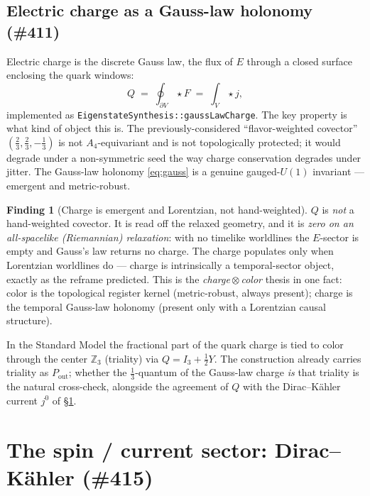 \documentclass[11pt]{article}
\theoremstyle{definition}
\newtheorem{finding}{Finding}
\newcommand{\Z}{\mathbb{Z}}
\newcommand{\Pout}{P_{\mathrm{out}}}
\newcommand{\code}[1]{\texttt{#1}}
\begin{document}
\subsection{Electric charge as a Gauss-law holonomy (\#411)}
\label{sec:gauss}

Electric charge is the discrete Gauss law, the flux of $E$ through a closed surface
enclosing the quark windows:
\begin{equation}
  Q \;=\; \oint_{\partial V} \star F \;=\; \int_V \star j ,
  \label{eq:gauss}
\end{equation}
implemented as \code{EigenstateSynthesis::gaussLawCharge}. The key property is what kind
of object this is. The previously-considered ``flavor-weighted covector''
$(\tfrac23,\tfrac23,-\tfrac13)$ is not $A_4$-equivariant and is not topologically
protected; it would degrade under a non-symmetric seed the way charge conservation
degrades under jitter. The Gauss-law holonomy \eqref{eq:gauss} is a genuine gauged-$U(1)$
invariant --- emergent and metric-robust.

\begin{finding}[Charge is emergent and Lorentzian, not hand-weighted]
\label{find:charge}
$Q$ is \emph{not} a hand-weighted covector. It is read off the relaxed geometry, and it is
\emph{zero on an all-spacelike (Riemannian) relaxation}: with no timelike worldlines the
$E$-sector is empty and Gauss's law returns no charge. The charge populates only when
Lorentzian worldlines do --- charge is intrinsically a temporal-sector object, exactly as
the reframe predicted. This is the \emph{charge}\,$\otimes$\,\emph{color} thesis in one
fact: color is the topological register kernel (metric-robust, always present); charge is
the temporal Gauss-law holonomy (present only with a Lorentzian causal structure).
\end{finding}

\noindent In the Standard Model the fractional part of the quark charge is tied to color
through the center $\Z_3$ (triality) via $Q=I_3+\tfrac12Y$. The construction already
carries triality as $\Pout$; whether the $\tfrac13$-quantum of the Gauss-law charge
\emph{is} that triality is the natural cross-check, alongside the agreement of $Q$ with the
Dirac--K\"ahler current $j^0$ of \S\ref{sec:dk}.

\section{The spin / current sector: Dirac--K\"ahler (\#415)}
\label{sec:dk}
\end{document}
